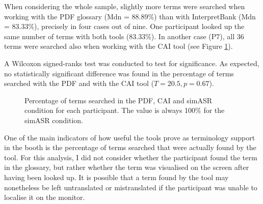 When considering the whole sample, slightly more terms were searched when working with the PDF glossary (Mdn = 88.89\%) than with InterpretBank (Mdn = 83.33\%), precisely in four cases out of nine. One participant looked up the same number of terms with both tools (83.33\%). In another case (P7), all 36 terms were searched also when working with the CAI tool (see Figure \ref{fig:termssearched}).

A Wilcoxon signed-ranks test was conducted to test for significance. As expected, no statistically significant difference was found in the percentage of terms searched with the PDF and with the CAI tool ($T = 20.5, p = 0.67$).

\begin{figure}
\caption[Percentage of terms searched]{Percentage of terms searched in the PDF, CAI and simASR condition for each participant. The value is always 100\% for the simASR condition.}
\label{fig:termssearched}
\end{figure}

 \label{terms_found}
One of the main indicators of how useful the tools prove as terminology support in the booth is the percentage of terms searched that were actually found by the tool. For this analysis, I did not consider whether the participant found the term in the glossary, but rather whether the term was visualised on the screen after having been looked up. It is possible that a term found by the tool may nonetheless be left untranslated or mistranslated if the participant was unable to localise it on the monitor.

